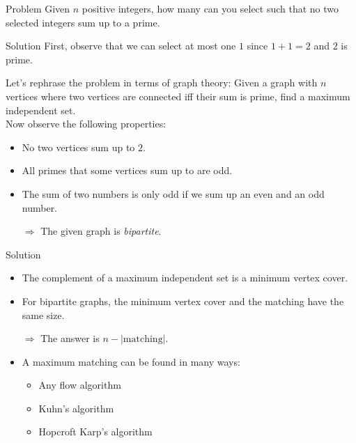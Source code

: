 \begin{slide}
	\begin{block}{Problem}
		Given $n$ positive integers, how many can you select such that no two  selected integers sum up to a prime.
	\end{block}
	\pause
	\begin{block}{Solution}
		First, observe that we can select at most one $1$ since $1+1=2$ and $2$ is prime.\\
		\pause
		\smallskip
		
		Let's rephrase the problem in terms of graph theory:
		Given a graph with $n$ vertices where two vertices are connected iff their sum is prime, find a maximum independent set.\\
		\pause
		\smallskip
		Now observe the following properties:
		\begin{itemize}
			\item No two vertices sum up to $2$.
			\item All primes that some vertices sum up to are odd.
			\item The sum of two numbers is only odd if we sum up an even and an odd number.
			\pause
			\item[$\Rightarrow$] The given graph is \emph{bipartite}.
		\end{itemize}
	\end{block}
\end{slide}

\begin{slide}
	\begin{block}{Solution}
		\begin{itemize}
			\item The complement of a maximum independent set is a minimum vertex cover.
			\item For bipartite graphs, the minimum vertex cover and the matching have the same size.
			\pause
			\item[$\Rightarrow$] The answer is $n-|\text{matching}|$.
			\smallskip
			\pause
			\item A maximum matching can be found in many ways:
			\begin{itemize}
				\item Any flow algorithm
				\item Kuhn's algorithm
				\item Hopcroft Karp's algorithm
			\end{itemize}
		\end{itemize}
	\end{block}
\end{slide}
